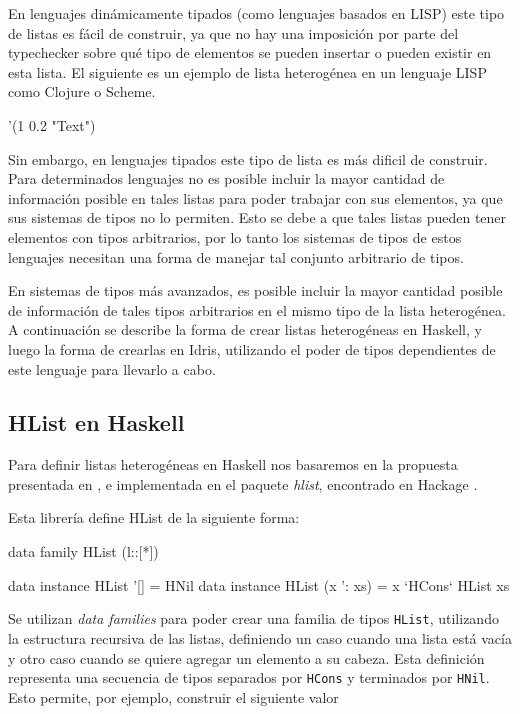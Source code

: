 En lenguajes dinámicamente tipados (como lenguajes basados en LISP) este tipo de listas es fácil de construir, ya que no hay una imposición por parte del typechecker sobre qué tipo de elementos se pueden insertar o pueden existir en esta lista. El siguiente es un ejemplo de lista heterogénea en un lenguaje LISP como Clojure o Scheme.

\begin{code}
'(1 0.2 "Text")
\end{code}

Sin embargo, en lenguajes tipados este tipo de lista es más dificil de construir. Para determinados lenguajes no es posible incluir la mayor cantidad de información posible en tales listas para poder trabajar con sus elementos, ya que sus sistemas de tipos no lo permiten. Esto se debe a que tales listas pueden tener elementos con tipos arbitrarios, por lo tanto los sistemas de tipos de estos lenguajes necesitan una forma de manejar tal conjunto arbitrario de tipos.

En sistemas de tipos más avanzados, es posible incluir la mayor cantidad posible de información de tales tipos arbitrarios en el mismo tipo de la lista heterogénea. 
A continuación se describe la forma de crear listas heterogéneas en Haskell, y luego la forma de crearlas en Idris, utilizando el poder de tipos dependientes de este lenguaje para llevarlo a cabo.

\subsection{HList en Haskell}

Para definir listas heterogéneas en Haskell nos basaremos en la propuesta presentada en \cite{Kiselyov:2004:STH:1017472.1017488}, e implementada en el paquete \textit{hlist}, encontrado en Hackage \cite{HListHackage}. 

Esta librería define HList de la siguiente forma:

\begin{code}
data family HList (l::[*])

data instance HList '[] = HNil
data instance HList (x ': xs) = x `HCons` HList xs
\end{code}

Se utilizan \textit{data families} para poder crear una familia de tipos \texttt{HList}, utilizando la estructura recursiva de las listas, definiendo un caso cuando una lista está vacía y otro caso cuando se quiere agregar un elemento a su cabeza.
Esta definición representa una secuencia de tipos separados por \texttt{HCons} y terminados por \texttt{HNil}. 
Esto permite, por ejemplo, construir el siguiente valor

